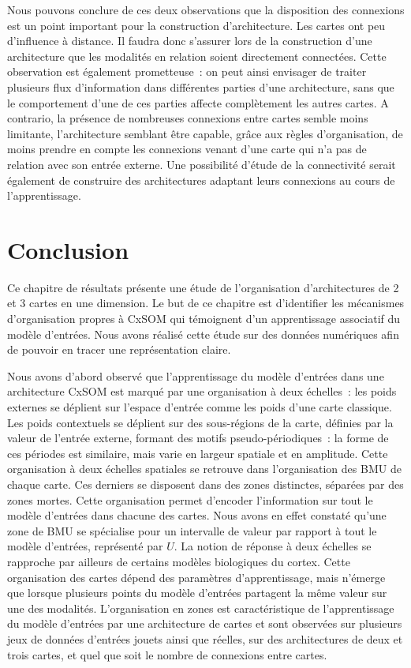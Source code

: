 \documentclass[../main]{subfiles}
\begin{document}
Nous pouvons conclure de ces deux observations que la disposition des connexions est un point important pour la construction d'architecture.
Les cartes ont peu d'influence à distance. Il faudra donc s'assurer lors de la construction d'une architecture que les modalités en relation soient directement connectées. Cette observation est également prometteuse~: on peut ainsi envisager de traiter plusieurs flux d'information dans différentes parties d'une architecture, sans que le comportement d'une de ces parties affecte complètement les autres cartes.
A contrario, la présence de nombreuses connexions entre cartes semble moins limitante, l'architecture semblant être capable, grâce aux règles d'organisation, de moins prendre en compte les connexions venant d'une carte qui n'a pas de relation avec son entrée externe. 
Une possibilité d'étude de la connectivité serait également de construire des architectures adaptant leurs connexions au cours de l'apprentissage.

\section{Conclusion}

Ce chapitre de résultats présente une étude de l'organisation d'architectures de 2 et 3 cartes en une dimension.
Le but de ce chapitre est d'identifier les mécanismes d'organisation propres à CxSOM qui témoignent d'un apprentissage associatif du modèle d'entrées.
Nous avons réalisé cette étude sur des données numériques afin de pouvoir en tracer une représentation claire.

Nous avons d'abord observé que l'apprentissage du modèle d'entrées dans une architecture CxSOM est marqué par une organisation à deux échelles~: les poids externes se déplient sur l'espace d'entrée comme les poids d'une carte classique. Les poids contextuels se déplient sur des sous-régions de la carte, définies par la valeur de l'entrée externe, formant des motifs pseudo-périodiques~: la forme de ces périodes est similaire, mais varie en largeur spatiale et en amplitude. 
Cette organisation à deux échelles spatiales se retrouve dans l'organisation des BMU de chaque carte.
Ces derniers se disposent dans des zones distinctes, séparées par des zones mortes. 
Cette organisation permet d'encoder l'information sur tout le modèle d'entrées dans chacune des cartes. Nous avons en effet constaté qu'une zone de BMU se spécialise pour un intervalle de valeur par rapport à tout le modèle d'entrées, représenté par $U$. 
La notion de réponse à deux échelles se rapproche par ailleurs de certains modèles biologiques du cortex.
Cette organisation des cartes dépend des paramètres d'apprentissage, mais n'émerge que lorsque plusieurs points du modèle d'entrées partagent la même valeur sur une des modalités.
L'organisation en zones est caractéristique de l'apprentissage du modèle d'entrées par une architecture de cartes et sont observées sur plusieurs jeux de données d'entrées jouets ainsi que réelles, sur des architectures de deux et trois cartes, et quel que soit le nombre de connexions entre cartes.
\end{document}
